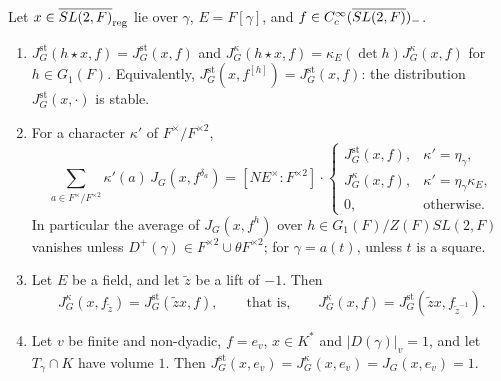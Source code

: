\begin{lemma}\label{lem:kappa-orbital}
Let $x\in\overline{SL(2,F)}_{\mathrm{reg}}$ lie over $\gamma$, $E=F[\gamma]$, and
$f\in C_c^\infty(\overline{SL(2,F)})_-$.
\begin{enumerate}[label=(\alph*)]
\item $J^{\mathrm{st}}_G(h\star x,f)=J^{\mathrm{st}}_G(x,f)$ and
  $J^\kappa_G(h\star x,f)=\kappa_E(\det h)J^\kappa_G(x,f)$ for $h\in
  G_1(F)$. Equivalently, $J^{\mathrm{st}}_G(x,f^{[h]})=J^{\mathrm{st}}_G(x,
  f)$: the distribution $J^{\mathrm{st}}_G(x,\cdot)$ is stable.
\item For a character $\kappa'$ of $F^\times/F^{\times2}$,
  \[
  \sum_{a\in F^\times/F^{\times2}}\kappa'(a)\,J_G(x,f^{\delta_a})
  =[N E^\times:F^{\times2}]\cdot\begin{cases}
  J^{\mathrm{st}}_G(x,f),&\kappa'=\eta_\gamma,\\
  J^{\kappa}_G(x,f),&\kappa'=\eta_\gamma\kappa_E,\\
  0,&\text{otherwise.}\end{cases}
  \]
  In particular the average of $J_G(x,f^h)$ over $h\in G_1(F)/Z(F)SL(2,F)$
  vanishes unless $D^+(\gamma)\in F^{\times2}\cup\theta F^{\times2}$; for
  $\gamma=a(t)$, unless $t$ is a square.
\item Let $E$ be a field, and let $\tilde z$ be a lift of $-1$. Then
  \[
  J^\kappa_G(x,f_{\tilde z})=J^{\mathrm{st}}_G(\tilde zx,f),
  \qquad\text{that is,}\qquad
  J^\kappa_G(x,f)=J^{\mathrm{st}}_G(\tilde zx,f_{\tilde z^{-1}}).
  \]
\item Let $v$ be finite and non-dyadic, $f=e_v$, $x\in K^*$ and
  $|D(\gamma)|_v=1$, and let $T_\gamma\cap K$ have volume $1$. Then
  $J^{\mathrm{st}}_G(x,e_v)=J^\kappa_G(x,e_v)=J_G(x,e_v)=1$.
\end{enumerate}
\end{lemma}

